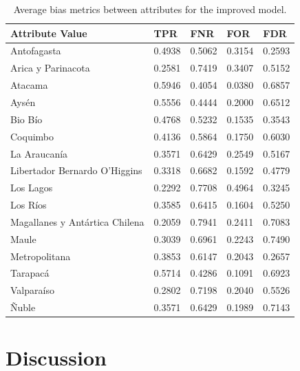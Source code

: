 \documentclass[twoside,11pt]{article}
\begin{document}
\begin{table}[!htb]
\centering
\begin{tabular}{|p{3.5cm}|p{1cm}|p{1cm}|p{1cm}|p{1cm}|}
\hline

        \textbf{Attribute Value} &  \textbf{TPR} &    \textbf{FNR} &      \textbf{FOR} &      \textbf{FDR} \\
\hline
                   Antofagasta & 0.4938 & 0.5062 &   0.3154 &   0.2593 \\
            Arica y Parinacota & 0.2581 & 0.7419 &   0.3407 &   0.5152 \\
                       Atacama & 0.5946 & 0.4054 &   0.0380 &   0.6857 \\
                         Aysén & 0.5556 & 0.4444 &   0.2000 &   0.6512 \\
                       Bio Bío & 0.4768 & 0.5232 &   0.1535 &   0.3543 \\
                      Coquimbo & 0.4136 & 0.5864 & 0.1750 &   0.6030 \\
                  La Araucanía & 0.3571 & 0.6429 &   0.2549 &   0.5167 \\
 Libertador Bernardo O'Higgins & 0.3318 & 0.6682 &   0.1592 &   0.4779 \\
                     Los Lagos & 0.2292 & 0.7708 &   0.4964 &   0.3245 \\
                      Los Ríos & 0.3585 & 0.6415 &   0.1604 & 0.5250 \\
Magallanes y Antártica Chilena & 0.2059 & 0.7941 &   0.2411 &   0.7083 \\
                         Maule & 0.3039 & 0.6961 &   0.2243 &   0.7490 \\
                 Metropolitana & 0.3853 & 0.6147 &   0.2043 &   0.2657 \\
                      Tarapacá & 0.5714 & 0.4286 &   0.1091 &   0.6923 \\
                    Valparaíso & 0.2802 & 0.7198 &   0.2040 &   0.5526 \\
                         Ñuble & 0.3571 & 0.6429 &   0.1989 &   0.7143 \\

\hline
\end{tabular}
\caption{Average bias metrics between attributes for the improved model.}
\label{tab_region_hfalta_opt:}
\end{table}



\section{Discussion}
\label{discussion}
\end{document}
